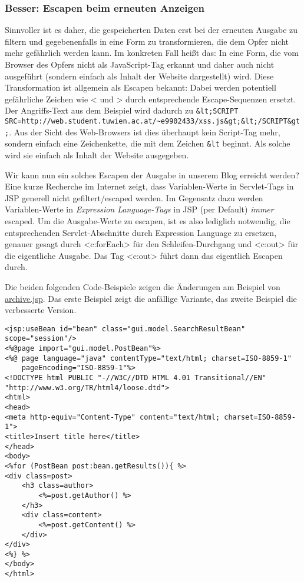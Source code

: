\subsubsection{Besser: Escapen beim erneuten Anzeigen}

Sinnvoller ist es daher, die gespeicherten Daten erst bei der erneuten Ausgabe zu filtern und gegebenenfalls in eine Form zu transformieren, die dem Opfer nicht mehr gefährlich werden kann. Im konkreten Fall heißt das: In eine Form, die vom Browser des Opfers nicht als JavaScript-Tag erkannt und daher auch nicht ausgeführt (sondern einfach als Inhalt der Website dargestellt) wird. Diese Transformation ist allgemein als Escapen bekannt: Dabei werden potentiell gefährliche Zeichen wie < und > durch entsprechende Escape-Sequenzen ersetzt. Der Angriffs-Text aus dem Beispiel wird dadurch zu \lstinline$&lt;SCRIPT SRC=http://web.student.tuwien.ac.at/~e9902433/xss.js&gt;&lt;/SCRIPT&gt;$. Aus der Sicht des Web-Browsers ist dies überhaupt kein Script-Tag mehr, sondern einfach eine Zeichenkette, die mit dem Zeichen \lstinline$&lt$ beginnt. Als solche wird sie einfach als Inhalt der Website ausgegeben.

Wir kann nun ein solches Escapen der Ausgabe in unserem Blog erreicht werden? Eine kurze Recherche im Internet zeigt, dass Variablen-Werte in Servlet-Tags in JSP generell nicht gefiltert/escaped werden. Im Gegensatz dazu werden Variablen-Werte in \emph{Expression Language-Tags} in JSP (per Default) \emph{immer} escaped. Um die Ausgabe-Werte zu escapen, ist es also lediglich notwendig, die entsprechenden Servlet-Abschnitte durch Expression Language zu ersetzen, genauer gesagt durch <c:forEach> für den Schleifen-Durchgang und <c:out> für die eigentliche Ausgabe. Das Tag <c:out> führt dann das eigentlich Escapen durch.

Die beiden folgenden Code-Beispiele zeigen die Änderungen am Beispiel von \url{archive.jsp}. Das erste Beispiel zeigt die anfällige Variante, das zweite Beispiel die verbesserte Version.

\begin{lstlisting}
<jsp:useBean id="bean" class="gui.model.SearchResultBean" scope="session"/>
<%@page import="gui.model.PostBean"%>
<%@ page language="java" contentType="text/html; charset=ISO-8859-1"
    pageEncoding="ISO-8859-1"%>
<!DOCTYPE html PUBLIC "-//W3C//DTD HTML 4.01 Transitional//EN" "http://www.w3.org/TR/html4/loose.dtd">
<html>
<head>
<meta http-equiv="Content-Type" content="text/html; charset=ISO-8859-1">
<title>Insert title here</title>
</head>
<body>
<%for (PostBean post:bean.getResults()){ %>
<div class=post>
	<h3 class=author>
		<%=post.getAuthor() %>
	</h3>
	<div class=content>
		<%=post.getContent() %>
	</div>
</div>
<%} %>
</body>
</html>
\end{lstlisting}

